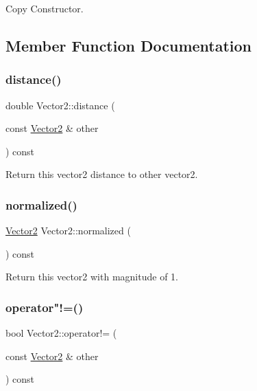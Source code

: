 Copy Constructor. 



\subsection{Member Function Documentation}
\mbox{\label{struct_vector2_a75a29091c7c6f2f38e987ed2c62283c8}} 
\subsubsection{\texorpdfstring{distance()}{distance()}}
{\footnotesize\ttfamily double Vector2\+::distance (\begin{DoxyParamCaption}\item[{const \mbox{\hyperlink{struct_vector2}{Vector2}} \&}]{other }\end{DoxyParamCaption}) const}



Return this vector2 distance to other vector2. 

\mbox{\label{struct_vector2_a1e0be0f2d578e8b5d0b8f95a9f8b6626}} 
\subsubsection{\texorpdfstring{normalized()}{normalized()}}
{\footnotesize\ttfamily \mbox{\hyperlink{struct_vector2}{Vector2}} Vector2\+::normalized (\begin{DoxyParamCaption}{ }\end{DoxyParamCaption}) const}



Return this vector2 with magnitude of 1. 

\mbox{\label{struct_vector2_af3b049c981a79bd60495b6362aa6392b}} 
\subsubsection{\texorpdfstring{operator"!=()}{operator!=()}}
{\footnotesize\ttfamily bool Vector2\+::operator!= (\begin{DoxyParamCaption}\item[{const \mbox{\hyperlink{struct_vector2}{Vector2}} \&}]{other }\end{DoxyParamCaption}) const}



